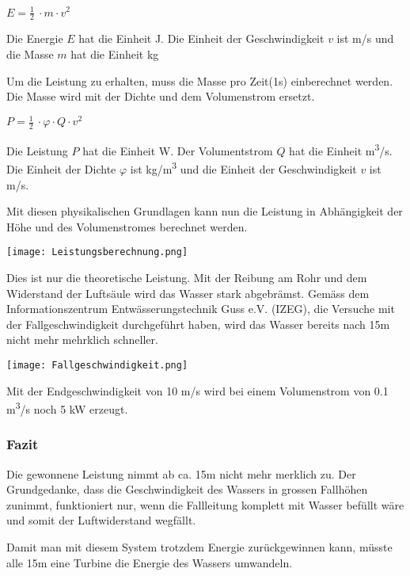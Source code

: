 \begin{center}
\(E =\frac 12\ \cdot m \cdot v^2\)
\end{center}

Die Energie \(E\) hat die Einheit \si{J}. Die Einheit der Geschwindigkeit \(v\) ist \si{m/s} und die Masse \(m\) hat die Einheit \si{kg}

\newpage

Um die Leistung zu erhalten, muss die Masse pro Zeit(1s) einberechnet werden. Die Masse wird  mit der Dichte und dem Volumenstrom ersetzt.

\begin{center}
\(P =\frac 12\ \cdot \varphi \cdot Q \cdot v^2\)
\end{center}

Die Leistung \(P\) hat die Einheit \si{W}. Der Volumentstrom \(Q\) hat die Einheit \si{m^3/s}. Die Einheit der Dichte \(\varphi\) ist \si{kg/m^3} und die Einheit der Geschwindigkeit \(v\) ist \si{m/s}.
\newline 
\newline
 \newline


Mit diesen physikalischen Grundlagen kann nun die Leistung in Abhängigkeit der Höhe und des Volumenstromes berechnet werden. 

\begin{center}
\texttt{[image: Leistungsberechnung.png]}
\end{center}

Dies ist nur die theoretische Leistung. Mit der Reibung am Rohr und dem Widerstand der Luftsäule wird das Wasser stark abgebrämst. Gemäss dem Informationszentrum Entwässerungstechnik Guss e.V. (IZEG), die Versuche mit der Fallgeschwindigkeit durchgeführt haben, wird das Wasser bereits nach 15\si{m} nicht mehr mehrklich schneller.

\begin{center}
\texttt{[image: Fallgeschwindigkeit.png]}
\end{center}

Mit der Endgeschwindigkeit von 10 \si{m/s} wird bei einem Volumenstrom von 0.1 \si{m^3/s} noch 5 \si{kW} erzeugt.

\subsubsection{Fazit}

Die gewonnene Leistung nimmt ab ca. 15\si{m} nicht mehr merklich zu. Der Grundgedanke, dass die Geschwindigkeit des Wassers in grossen Fallhöhen zunimmt, funktioniert nur, wenn die Fallleitung komplett mit Wasser befüllt wäre und somit der Luftwiderstand wegfällt.

Damit man mit diesem System trotzdem Energie zurückgewinnen kann, müsste alle 15\si{m} eine Turbine die Energie des Wassers umwandeln.

\clearpage 





